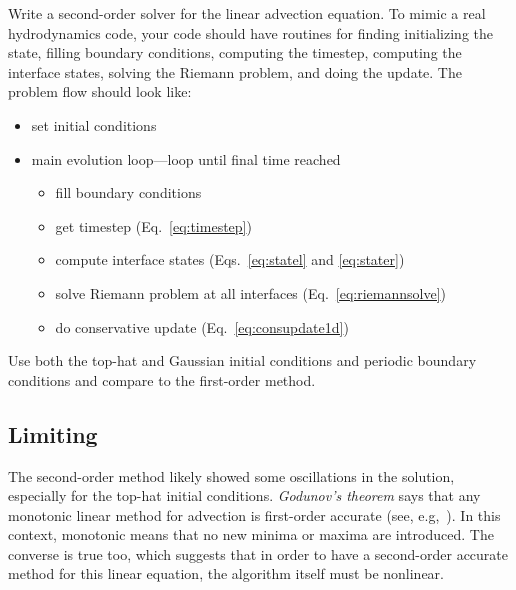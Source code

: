 \begin{exercise}
{Write a second-order solver for the linear advection
  equation.  To mimic a real hydrodynamics code, your code should have
  routines for finding initializing the state, filling boundary conditions,
  computing the timestep,
  computing the interface states, solving the Riemann problem, and
  doing the update.  The problem flow should look like:
  \begin{itemize}
    \item set initial conditions
    \item main evolution loop---loop until final time reached
    \begin{itemize}
      \item fill boundary conditions
      \item get timestep (Eq.~\ref{eq:timestep})
      \item compute interface states (Eqs.~\ref{eq:statel} and \ref{eq:stater})
      \item solve Riemann problem at all interfaces (Eq.~\ref{eq:riemannsolve})
      \item do conservative update (Eq.~\ref{eq:consupdate1d})
    \end{itemize}
  \end{itemize}
Use both the top-hat and Gaussian initial conditions and periodic boundary
conditions and compare to the first-order method.
}
\end{exercise}

\subsection{Limiting}

The second-order method likely showed some oscillations in the
solution, especially for the top-hat initial conditions.  {\em
  Godunov's theorem} says that any monotonic linear method for
advection is first-order accurate (see, e.g,~\cite{laney}).  In this
context, monotonic means that no new minima or maxima are introduced.
The converse is true too, which suggests that in order to have a
second-order accurate method for this linear equation, the algorithm
itself must be nonlinear.

